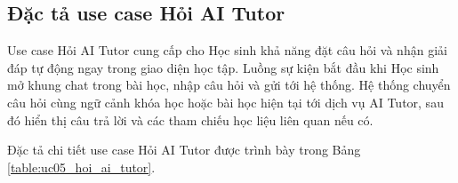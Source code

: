 ﻿\documentclass[../DoAn.tex]{subfiles}
\begin{document}
\subsection{Đặc tả use case Hỏi AI Tutor}
\label{subsection:2.3.5}

Use case Hỏi AI Tutor cung cấp cho Học sinh khả năng đặt câu hỏi và nhận giải đáp tự động ngay trong giao diện học tập. Luồng sự kiện bắt đầu khi Học sinh mở khung chat trong bài học, nhập câu hỏi và gửi tới hệ thống. Hệ thống chuyển câu hỏi cùng ngữ cảnh khóa học hoặc bài học hiện tại tới dịch vụ AI Tutor, sau đó hiển thị câu trả lời và các tham chiếu học liệu liên quan nếu có.

Đặc tả chi tiết use case Hỏi AI Tutor được trình bày trong Bảng \ref{table:uc05_hoi_ai_tutor}.

\begingroup
\small
\renewcommand{\arraystretch}{1.15}
\setlength{\LTpre}{0pt}
\setlength{\LTpost}{0pt}
\end{document}
